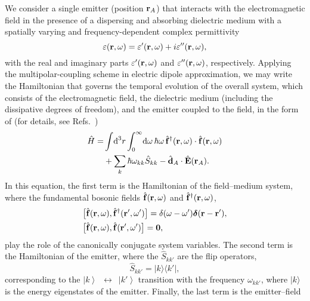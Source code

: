 \documentclass[pra, twocolumn]{revtex4}
\newcommand{\D}{\mbox{\rm d}}
\newcommand{\hb}[1]{\hat{\mathbf{#1}}}
\newcommand{\ket}[1]{$\left|#1\right\rangle$}
\begin{document}
We consider a single emitter (position ${\bf r}_A$)
that interacts with the electromagnetic field
in the presence of a dispersing and absorbing dielectric medium with a
spatially
varying and frequency-dependent complex permittivity
\begin{equation}
    \label{1.0}
      \varepsilon({\bf r},\omega) = \varepsilon'({\bf r},\omega)
      + i\varepsilon''({\bf r},\omega),
\end{equation}
with the real and imaginary parts $\varepsilon'({\bf r},\omega)$
and $\varepsilon''({\bf r},\omega)$, respectively.
Applying the multipolar-coupling scheme in electric dipole
approximation, we may write the Hamiltonian
that governs the temporal evolution
of the overall system, which consists of the electromagnetic
field, the dielectric medium (including the dissipative degrees
of freedom), and the emitter coupled to the field,
in the form of (for details, see Refs.~\cite{knoell:1, vogel})
\begin{align}
   \label{1.1}
        \hat{H} =
&
        \int\! \D^3{r} \int_0^\infty\! \D\omega
      \,\hbar\omega\,\hb {f}^{\dagger}({\bf r },\omega)\cdot
      \hb{ f}({\bf r},\omega)
\nonumber\\&
+
	  \sum _k
        \hbar
\omega _{kk}
\hat{S} _{kk}
-
   \hb{ d}_A\cdot
        \hb{E}({\bf r}_A)
.
\end{align}
In this equation, the first term is the Hamiltonian of
the \mbox{field--me}\-dium system, where the
fundamental
bosonic fields
\mbox{$\hb{ f}({\bf r},\omega)$}
and \mbox{$\hb{f}^\dagger({\bf r},\omega)$},
\begin{align}
    \label{1.3}
    &      \bigl[\hb{f} ({\bf r}, \omega),
      \hb{f} ^{\dagger } ({\bf r }',  \omega ') \bigr]
      = 
      \delta (\omega - \omega  ')
      \bm{\delta}
      ({\bf r} - {\bf r }') ,
\\
\label{1.3-1}
&\bigl[\hb{f} ({\bf r}, \omega),
      \hb{f} ({\bf r }',  \omega ') \bigr]
= \bm{0},
\end{align}
play the role of the canonically conjugate system variables.
The second term is the Hamiltonian of the emitter, where
the $\hat{S}_{kk'}$ are the flip operators,
\begin{equation}
   \label{1.5}
   \hat{S} _{kk'} =
   | k\rangle
   \!\langle k' |
,
\end{equation}
corresponding to the \mbox{\ket{k} $\!\leftrightarrow$ \!\ket{k'}} transition
with the frequency $\omega_{kk'}$,
where
$|k\rangle$
is the energy eigenstates
of the emitter. Finally, the last term is the emitter--field
\end{document}
